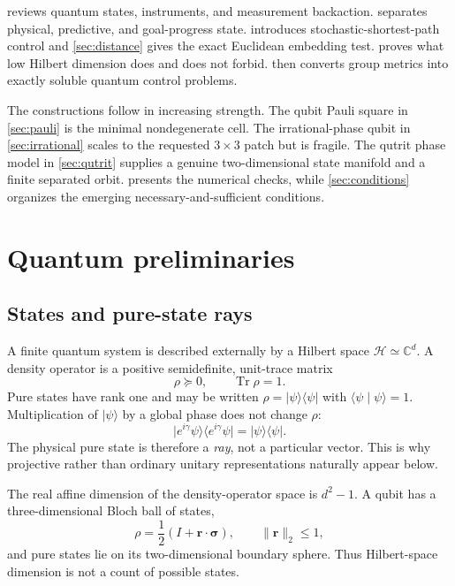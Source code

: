 \documentclass[11pt]{article}
\theoremstyle{definition}
\theoremstyle{remark}
\newcommand{\C}{\mathbb C}
\newcommand{\Tr}{\operatorname{Tr}}
\newcommand{\ket}[1]{\lvert #1\rangle}
\newcommand{\braket}[2]{\langle #1\mid #2\rangle}
\newcommand{\proj}[1]{\lvert #1\rangle\!\langle #1\rvert}
\begin{document}
 reviews quantum states, instruments, and measurement
backaction.  separates physical, predictive, and
goal-progress state.  introduces stochastic-shortest-path
control and \cref{sec:distance} gives the exact Euclidean embedding test.
 proves what low Hilbert dimension does and does not
forbid.  then converts group metrics into exactly soluble
quantum control problems.

The constructions follow in increasing strength. The qubit Pauli square in
\cref{sec:pauli} is the minimal nondegenerate cell. The irrational-phase
qubit in \cref{sec:irrational} scales to the requested $3\times3$ patch but is
fragile. The qutrit phase model in \cref{sec:qutrit} supplies a genuine
two-dimensional state manifold and a finite separated orbit.
 presents the numerical checks, while
\cref{sec:conditions} organizes the emerging necessary-and-sufficient
conditions.

\section{Quantum preliminaries}
\label{sec:quantum}

\subsection{States and pure-state rays}

A finite quantum system is described externally by a Hilbert space
$\mathcal H\simeq\C^d$. A density operator is a positive semidefinite,
unit-trace matrix
\begin{equation}
  \rho\succeq0,\qquad \Tr\rho=1.
  \label{eq:density}
\end{equation}
Pure states have rank one and may be written
$\rho=\proj{\psi}$ with $\braket{\psi}{\psi}=1$. Multiplication of
$\ket{\psi}$ by a global phase does not change $\rho$:
\begin{equation}
  \proj{e^{i\gamma}\psi}=\proj{\psi}.
\end{equation}
The physical pure state is therefore a \emph{ray}, not a particular vector.
This is why projective rather than ordinary unitary representations naturally
appear below.

The real affine dimension of the density-operator space is $d^2-1$. A qubit
has a three-dimensional Bloch ball of states,
\begin{equation}
  \rho=\frac12(I+\bm r\cdot\bm\sigma),\qquad \|\bm r\|_2\le1,
  \label{eq:bloch}
\end{equation}
and pure states lie on its two-dimensional boundary sphere. Thus
Hilbert-space dimension is not a count of possible states.
\end{document}
